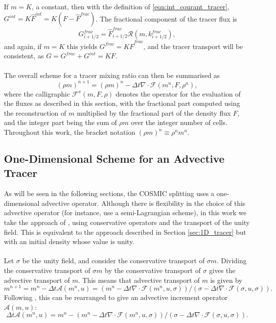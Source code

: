 \documentclass[11pt,a4paper]{article}
\begin{document}
If $m=K$, a constant, then with the definition of \eqref{eqn:int_courant_tracer}, $G^{int}=K\widehat{F}^{int}=K(F - \widehat{F}^{frac})$.
The fractional component of the tracer flux is
\begin{equation}
G_{i+1/2}^{frac} = \widehat{F}_{i+1/2}^{frac} \mathcal{R}(m,k_{i+1/2}^{frac}),
\end{equation}
and again, if $m=K$ this yields $G^{frac}=K\widehat{F}^{frac}$, and the tracer transport will be consistent, as $G=G^{frac}+G^{int}=KF$. \\
\\
The overall scheme for a tracer mixing ratio can then be summarised as
\begin{equation} \label{eqn:1D_density}
(\rho m)^{n+1} = (\rho m)^n - \Delta t \nabla\cdot \mathcal{F}(m^n,F,\rho^n),
\end{equation}
where the calligraphic $\mathcal{F}^x(m,F,\rho)$ denotes the operator for the evaluation of the fluxes as described in this section, with the fractional part computed using the reconstruction of $m$ multiplied by the fractional part of the density flux $F$, and the integer part being the sum of $\rho m$ over the integer number of cells.
Throughout this work, the bracket notation $(\rho m)^n\equiv \rho^n m^n$.

\subsection{One-Dimensional Scheme for an Advective Tracer} \label{sec:1d_advect}

As will be seen in the following sections, the COSMIC splitting uses a one-dimensional advective operator.
Although there is flexibility in the choice of this advective operator (for instance, \citet{lin1996ffsl} use a semi-Lagrangian scheme), in this work we take the approach of \citet{putman2007fvtransport}, using conservative operators and the transport of the unity field.
This is equivalent to the approach described in Section \ref{sec:1D_tracer} but with an initial density whose value is unity. \\
\\
Let $\sigma$ be the unity field, and consider the conservative transport of $\sigma m$.
Dividing the conservative transport of $\sigma m$ by the conservative transport of $\sigma$ gives the advective transport of $m$.
This means that advective transport of $m$ is given by
\begin{equation} \label{eqn:one_d_advection_tracer_2}
m^{n+1} = m^{n} - \Delta{t} \mathcal{A}(m^n,u) = \left( m^n - \Delta{t} \nabla\cdot \mathcal{F}(m^n,u,\sigma)\right)/\left( \sigma - \Delta{t} \nabla\cdot \mathcal{F}(\sigma,u,\sigma)\right).
\end{equation}
Following \citet{putman2007fvtransport}, this can be rearranged to give an advective increment operator $\mathcal{A}(m,u)$:
\begin{equation}
    \Delta{t} \mathcal{A}(m^n, u) = m^n - \left( m^n - \Delta{t} \nabla\cdot \mathcal{F}(m^n,u,\sigma)\right)/\left( \sigma - \Delta{t} \nabla\cdot \mathcal{F}(\sigma,u,\sigma)\right).
\end{equation}
\end{document}
